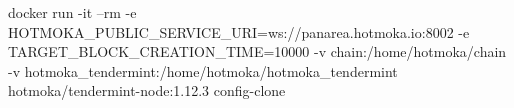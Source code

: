 \begin{shellcommandbox}\begin{ttlst}
docker run -it --rm -e HOTMOKA_PUBLIC_SERVICE_URI=ws://panarea.hotmoka.io:8002 -e TARGET_BLOCK_CREATION_TIME=10000 -v chain:/home/hotmoka/chain -v hotmoka_tendermint:/home/hotmoka/hotmoka_tendermint hotmoka/tendermint-node:1.12.3 config-clone
\end{ttlst}\end{shellcommandbox}
